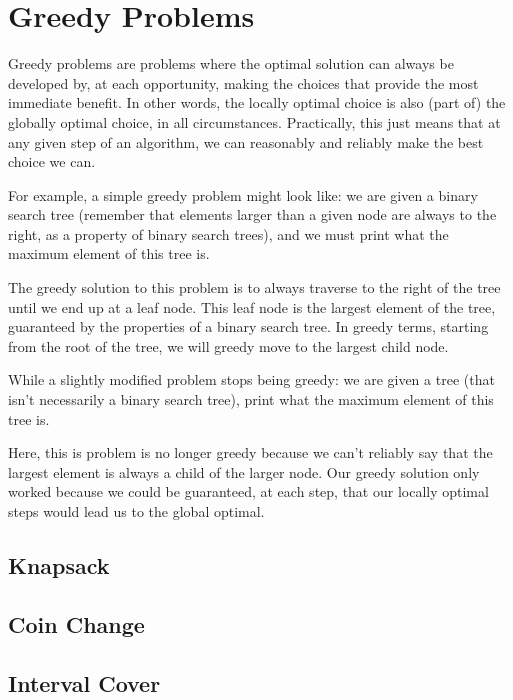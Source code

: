 \section{Greedy Problems}

Greedy problems are problems where the optimal solution can always be developed by, at each opportunity, making the choices that provide the most immediate benefit. In other words, the locally optimal choice is also (part of) the globally optimal choice, in all circumstances. Practically, this just means that at any given step of an algorithm, we can reasonably and reliably make the best choice we can.

For example, a simple greedy problem might look like: we are given a binary search tree (remember that elements larger than a given node are always to the right, as a property of binary search trees), and we must print what the maximum element of this tree is.

The greedy solution to this problem is to always traverse to the right of the tree until we end up at a leaf node. This leaf node is the largest element of the tree, guaranteed by the properties of a binary search tree. In greedy terms, starting from the root of the tree, we will greedy move to the largest child node.

While a slightly modified problem stops being greedy: we are given a tree (that isn't necessarily a binary search tree), print what the maximum element of this tree is.

Here, this is problem is no longer greedy because we can't reliably say that the largest element is always a child of the larger node. Our greedy solution only worked because we could be guaranteed, at each step, that our locally optimal steps would lead us to the global optimal.

\subsection{Knapsack}

\subsection{Coin Change}

\subsection{Interval Cover}